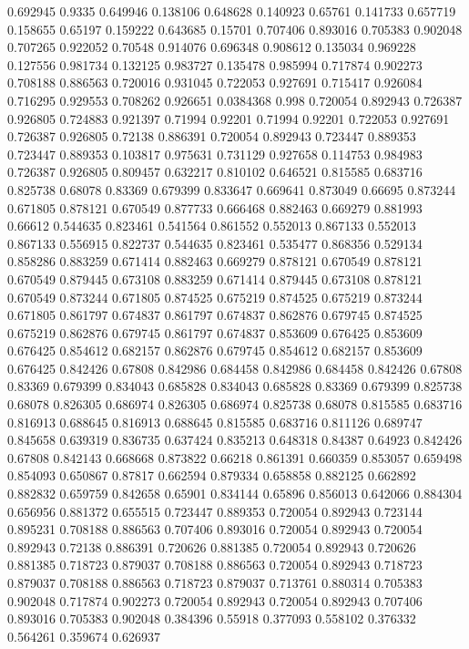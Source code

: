 0.692945 0.9335
0.649946 0.138106
0.648628 0.140923
0.65761 0.141733
0.657719 0.158655
0.65197 0.159222
0.643685 0.15701
0.707406 0.893016
0.705383 0.902048
0.707265 0.922052
0.70548 0.914076
0.696348 0.908612
0.135034 0.969228
0.127556 0.981734
0.132125 0.983727
0.135478 0.985994
0.717874 0.902273
0.708188 0.886563
0.720016 0.931045
0.722053 0.927691
0.715417 0.926084
0.716295 0.929553
0.708262 0.926651
0.0384368 0.998
0.720054 0.892943
0.726387 0.926805
0.724883 0.921397
0.71994 0.92201
0.71994 0.92201
0.722053 0.927691
0.726387 0.926805
0.72138 0.886391
0.720054 0.892943
0.723447 0.889353
0.723447 0.889353
0.103817 0.975631
0.731129 0.927658
0.114753 0.984983
0.726387 0.926805
0.809457 0.632217
0.810102 0.646521
0.815585 0.683716
0.825738 0.68078
0.83369 0.679399
0.833647 0.669641
0.873049 0.66695
0.873244 0.671805
0.878121 0.670549
0.877733 0.666468
0.882463 0.669279
0.881993 0.66612
0.544635 0.823461
0.541564 0.861552
0.552013 0.867133
0.552013 0.867133
0.556915 0.822737
0.544635 0.823461
0.535477 0.868356
0.529134 0.858286
0.883259 0.671414
0.882463 0.669279
0.878121 0.670549
0.878121 0.670549
0.879445 0.673108
0.883259 0.671414
0.879445 0.673108
0.878121 0.670549
0.873244 0.671805
0.874525 0.675219
0.874525 0.675219
0.873244 0.671805
0.861797 0.674837
0.861797 0.674837
0.862876 0.679745
0.874525 0.675219
0.862876 0.679745
0.861797 0.674837
0.853609 0.676425
0.853609 0.676425
0.854612 0.682157
0.862876 0.679745
0.854612 0.682157
0.853609 0.676425
0.842426 0.67808
0.842986 0.684458
0.842986 0.684458
0.842426 0.67808
0.83369 0.679399
0.834043 0.685828
0.834043 0.685828
0.83369 0.679399
0.825738 0.68078
0.826305 0.686974
0.826305 0.686974
0.825738 0.68078
0.815585 0.683716
0.816913 0.688645
0.816913 0.688645
0.815585 0.683716
0.811126 0.689747
0.845658 0.639319
0.836735 0.637424
0.835213 0.648318
0.84387 0.64923
0.842426 0.67808
0.842143 0.668668
0.873822 0.66218
0.861391 0.660359
0.853057 0.659498
0.854093 0.650867
0.87817 0.662594
0.879334 0.658858
0.882125 0.662892
0.882832 0.659759
0.842658 0.65901
0.834144 0.65896
0.856013 0.642066
0.884304 0.656956
0.881372 0.655515
0.723447 0.889353
0.720054 0.892943
0.723144 0.895231
0.708188 0.886563
0.707406 0.893016
0.720054 0.892943
0.720054 0.892943
0.72138 0.886391
0.720626 0.881385
0.720054 0.892943
0.720626 0.881385
0.718723 0.879037
0.708188 0.886563
0.720054 0.892943
0.718723 0.879037
0.708188 0.886563
0.718723 0.879037
0.713761 0.880314
0.705383 0.902048
0.717874 0.902273
0.720054 0.892943
0.720054 0.892943
0.707406 0.893016
0.705383 0.902048
0.384396 0.55918
0.377093 0.558102
0.376332 0.564261
0.359674 0.626937
